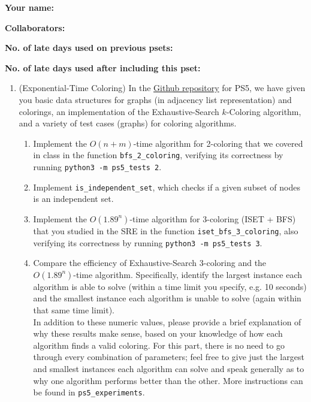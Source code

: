 \documentclass[11pt]{article}
\begin{document}

\textbf{Your name: }

\textbf{Collaborators: }

\textbf{No. of late days used on previous psets: }

\textbf{No. of late days used after including this pset: }

\begin{enumerate}
 
 \item (Exponential-Time Coloring) 
  In the \href{https://github.com/Harvard-CS-120/cs120/tree/main/fall2023/psets}{Github repository} for PS5, we have given you basic data structures for graphs (in adjacency list representation) and colorings, an implementation of the Exhaustive-Search $k$-Coloring algorithm, and a variety of test cases (graphs) for coloring algorithms.

  \begin{enumerate}
      \item Implement the $O(n+m)$-time algorithm for 2-coloring that we covered in class in the function \texttt{bfs\_2\_coloring}, verifying its correctness by running \texttt{python3 -m ps5\_tests 2}.
      
      \item Implement \texttt{is\_independent\_set}, which checks if a given subset of nodes is an independent set.
      
      \item Implement the $O(1.89^n)$-time algorithm for 3-coloring (ISET + BFS) that you studied in the SRE in the function \texttt{iset\_bfs\_3\_coloring}, also verifying its correctness by running \texttt{python3 -m ps5\_tests 3}. \label{part:TbT}
    
    \item Compare the efficiency of Exhaustive-Search 3-coloring and the $O(1.89^n)$-time algorithm. Specifically, identify the largest instance each algorithm is able to solve (within a time limit you specify, e.g. 10 seconds) and the smallest instance each algorithm is unable to solve (again within that same time limit). \\
    
    In addition to these numeric values, please provide a brief explanation of why these results make sense, based on your knowledge of how each algorithm finds a valid coloring. For this part, there is no need to go through every combination of parameters; feel free to give just the largest and smallest instances each algorithm can solve and speak generally as to why one algorithm performs better than the other. More instructions can be found in \texttt{ps5\_experiments}.
      

\end{enumerate}
\end{enumerate}
\end{document}
